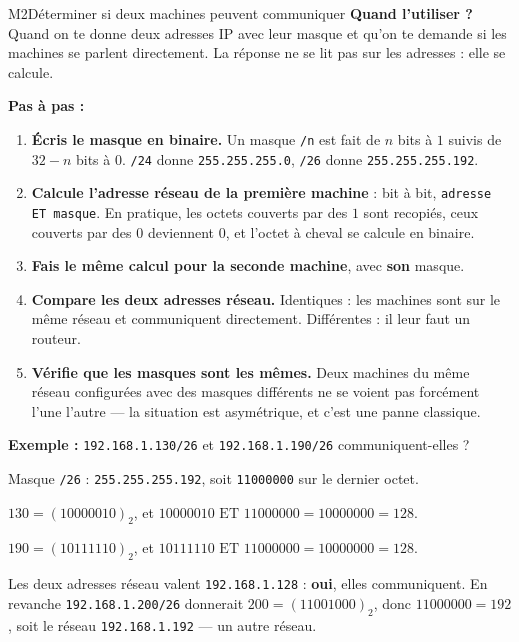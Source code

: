 \begin{fichemethode}{M2}{Déterminer si deux machines peuvent communiquer}
\textbf{Quand l'utiliser ?} Quand on te donne deux adresses IP avec leur masque et qu'on te
demande si les machines se parlent directement. La réponse ne se lit pas sur les adresses :
elle se calcule.

\textbf{Pas à pas :}
\begin{enumerate}
  \item \textbf{Écris le masque en binaire.} Un masque \lstinline{/n} est fait de $n$ bits à
    $1$ suivis de $32-n$ bits à $0$. \lstinline{/24} donne
    \lstinline{255.255.255.0}, \lstinline{/26} donne \lstinline{255.255.255.192}.
  \item \textbf{Calcule l'adresse réseau de la première machine} : bit à bit,
    \lstinline{adresse ET masque}. En pratique, les octets couverts par des $1$ sont
    recopiés, ceux couverts par des $0$ deviennent $0$, et l'octet à cheval se calcule en
    binaire.
  \item \textbf{Fais le même calcul pour la seconde machine}, avec \textbf{son} masque.
  \item \textbf{Compare les deux adresses réseau.} Identiques : les machines sont sur le
    même réseau et communiquent directement. Différentes : il leur faut un routeur.
  \item \textbf{Vérifie que les masques sont les mêmes.} Deux machines du même réseau
    configurées avec des masques différents ne se voient pas forcément l'une l'autre — la
    situation est asymétrique, et c'est une panne classique.
\end{enumerate}

\textbf{Exemple :} \lstinline{192.168.1.130/26} et \lstinline{192.168.1.190/26}
communiquent-elles ?

Masque \lstinline{/26} : \lstinline{255.255.255.192}, soit \lstinline{11000000} sur le
dernier octet.

$130 = (10000010)_2$, et $10000010 \text{ ET } 11000000 = 10000000 = 128$.

$190 = (10111110)_2$, et $10111110 \text{ ET } 11000000 = 10000000 = 128$.

Les deux adresses réseau valent \lstinline{192.168.1.128} : \textbf{oui}, elles
communiquent. En revanche \lstinline{192.168.1.200/26} donnerait
$200 = (11001000)_2$, donc $11000000 = 192$, soit le réseau
\lstinline{192.168.1.192} — un autre réseau.


\end{fichemethode}
